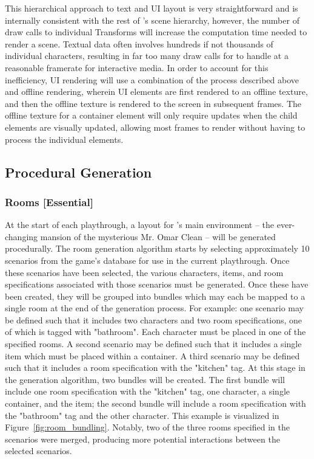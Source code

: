\documentclass{GlobalDocument}
\begin{document}
This hierarchical approach to text and UI layout is very straightforward and is internally consistent with the rest of \ourengine{}'s scene hierarchy, however, the number of draw calls to individual Transforms will increase the computation time needed to render a scene. Textual data often involves hundreds if not thousands of individual characters, resulting in far too many draw calls for \ourengine{} to handle at a reasonable framerate for interactive media. In order to account for this inefficiency, UI rendering will use a combination of the process described above and offline rendering, wherein UI elements are first rendered to an offline texture, and then the offline texture is rendered to the screen in subsequent frames. The offline texture for a container element will only require updates when the child elements are visually updated, allowing most frames to render without having to process the individual elements.


\subsection{Procedural Generation}
\subsubsection{Rooms [Essential]}
\label{sec:room_generation}
At the start of each playthrough, a layout for \ourgame{}'s main environment -- the ever-changing mansion of the mysterious Mr. Omar Clean -- will be generated procedurally. The room generation algorithm starts by selecting approximately 10 scenarios from the game's database for use in the current playthrough. Once these scenarios have been selected, the various characters, items, and room specifications associated with those scenarios must be generated. Once these have been created, they will be grouped into bundles which may each be mapped to a single room at the end of the generation process. For example: one scenario may be defined such that it includes two characters and two room specifications, one of which is tagged with "bathroom". Each character must be placed in one of the specified rooms. A second scenario may be defined such that it includes a single item which must be placed within a container. A third scenario may be defined such that it includes a room specification with the "kitchen" tag. At this stage in the generation algorithm, two bundles will be created. The first bundle will include one room specification with the "kitchen" tag, one character, a single container, and the item; the second bundle will include a room specification with the "bathroom" tag and the other character. This example is visualized in Figure~\ref{fig:room_bundling}. Notably, two of the three rooms specified in the scenarios were merged, producing more potential interactions between the selected scenarios.
\end{document}
